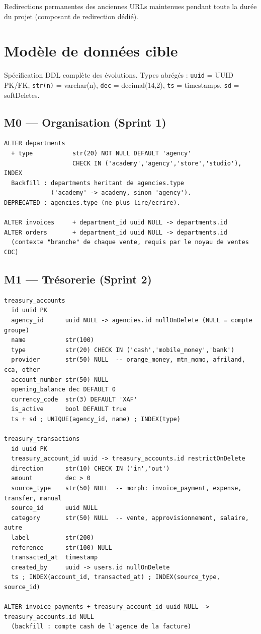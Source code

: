 \documentclass[11pt,a4paper]{article}
\begin{document}
Redirections permanentes des anciennes URLs maintenues pendant toute la durée du projet (composant de redirection dédié).

\section{Modèle de données cible}\label{sec:modele}

Spécification DDL complète des évolutions. Types abrégés : \verb|uuid| = UUID PK/FK, \verb|str(n)| = varchar(n), \verb|dec| = decimal(14,2), \verb|ts| = timestamps, \verb|sd| = softDeletes.

\subsection{M0 --- Organisation (Sprint 1)}

\begin{lstlisting}
ALTER departments
  + type           str(20) NOT NULL DEFAULT 'agency'
                   CHECK IN ('academy','agency','store','studio'), INDEX
  Backfill : departments heritant de agencies.type
             ('academy' -> academy, sinon 'agency').
DEPRECATED : agencies.type (ne plus lire/ecrire).

ALTER invoices     + department_id uuid NULL -> departments.id
ALTER orders       + department_id uuid NULL -> departments.id
  (contexte "branche" de chaque vente, requis par le noyau de ventes CDC)
\end{lstlisting}

\subsection{M1 --- Trésorerie (Sprint 2)}

\begin{lstlisting}
treasury_accounts
  id uuid PK
  agency_id      uuid NULL -> agencies.id nullOnDelete (NULL = compte groupe)
  name           str(100)
  type           str(20) CHECK IN ('cash','mobile_money','bank')
  provider       str(50) NULL  -- orange_money, mtn_momo, afriland, cca, other
  account_number str(50) NULL
  opening_balance dec DEFAULT 0
  currency_code  str(3) DEFAULT 'XAF'
  is_active      bool DEFAULT true
  ts + sd ; UNIQUE(agency_id, name) ; INDEX(type)

treasury_transactions
  id uuid PK
  treasury_account_id uuid -> treasury_accounts.id restrictOnDelete
  direction      str(10) CHECK IN ('in','out')
  amount         dec > 0
  source_type    str(50) NULL  -- morph: invoice_payment, expense, transfer, manual
  source_id      uuid NULL
  category       str(50) NULL  -- vente, approvisionnement, salaire, autre
  label          str(200)
  reference      str(100) NULL
  transacted_at  timestamp
  created_by     uuid -> users.id nullOnDelete
  ts ; INDEX(account_id, transacted_at) ; INDEX(source_type, source_id)

ALTER invoice_payments + treasury_account_id uuid NULL -> treasury_accounts.id NULL
  (backfill : compte cash de l'agence de la facture)
\end{lstlisting}
\end{document}
